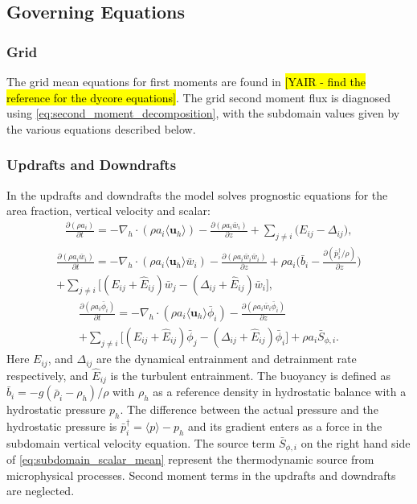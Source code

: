 \documentclass{report}
\begin{document}
\subsection{Governing Equations} \label{sec:Governing Equations}
\subsubsection{Grid} 
The grid mean equations for first moments are found in \hl{[YAIR - find the reference for the dycore equations]}. The grid second moment flux is diagnosed using \eqref{eq:second_moment_decomposition}, with the subdomain values given by the various equations described below.

\subsubsection{Updrafts and Downdrafts}
In the updrafts and downdrafts the model solves prognostic equations for the area fraction, vertical velocity and scalar:
\begin{eqnarray}
\frac{\partial (\rho a_i)}{\partial t} =
- \nabla_h \cdot (\rho a_i \langle \mathbf{u}_h \rangle) - 
\frac{\partial (\rho a_i \bar{w}_i)}{\partial z} +
\sum_{j \ne i}{\Big(E_{ij} - \Delta_{ij} \Big)},
\label{eq:subdomain_area}
\end{eqnarray}
\begin{multline}
\label{eq:subdomain_w} 
\frac{\partial (\rho a_i \bar{w}_i)}{\partial t} =
- \nabla_h \cdot (\rho a_i \langle \mathbf{u}_h \rangle \bar{w}_i) - \frac{\partial (\rho a_i \bar{w}_i \bar{w}_i) }{\partial z} 
+ \rho a_i \Big( \bar{b}_i - 
\frac{\partial (\bar{p}_i^{\dagger}/\rho)}{\partial z}\Big) \\
+ \sum_{j \ne i}{ \Big[ (E_{ij} + \hat{E}_{ij}) \bar{w}_j} - (\Delta_{ij} + \hat{E}_{ij}) \bar{w}_i \Big],
\end{multline}
\begin{multline}
 \label{eq:subdomain_scalar_mean} 
\frac{\partial (\rho a_i \bar{\phi}_i)}{\partial t} =
- \nabla_h \cdot (\rho a_i \langle \mathbf{u}_h \rangle \bar{\phi}_i) - \frac{\partial (\rho a_i \bar{w}_i \bar{\phi}_i)}{\partial z} \\
+ \sum_{j \ne i}{\Big[(E_{ij} + \hat{E}_{ij}) \bar{\phi}_j  - (\Delta_{ij} + \hat{E}_{ij}) \bar{\phi}_i \Big]} 
+ \rho a_i \bar{S}_{\phi,i}.
\end{multline}
Here $E_{ij}$, and $\Delta_{ij}$ are the dynamical entrainment and detrainment rate respectively, and $\hat{E}_{ij}$ is the turbulent entrainment. The buoyancy is defined as $\bar{b}_i = -g(\bar{\rho}_i-\rho_h)/\rho$ with $\rho_h$ as a reference density in hydrostatic balance with a hydrostatic pressure $p_h$. The difference between the actual pressure and the hydrostatic pressure is $\bar{p}_i^{\dagger} = \langle p \rangle - p_h$ and its gradient enters as a force in the subdomain vertical velocity equation. The source term $\bar{S}_{\phi,i}$ on the right hand side of \eqref{eq:subdomain_scalar_mean} represent the thermodynamic source from microphysical processes. Second moment terms in the updrafts and downdrafts are neglected.
\end{document}
